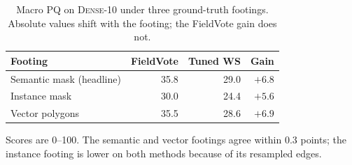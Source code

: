 \documentclass[conference]{IEEEtran}
\begin{document}
\begin{table}[t]
\centering
\caption{Macro PQ on \textsc{Dense-10} under three ground-truth footings. Absolute values shift with the footing; the FieldVote gain does not.}
\label{tab:footing}
\begin{tabular}{@{}lrrr@{}}
\toprule
Footing & FieldVote & Tuned WS & Gain \\
\midrule
Semantic mask (headline) & 35.8 & 29.0 & $+6.8$ \\
Instance mask & 30.0 & 24.4 & $+5.6$ \\
Vector polygons & 35.5 & 28.6 & $+6.9$ \\
\bottomrule
\end{tabular}

\smallskip
\begin{minipage}{0.94\columnwidth}
\footnotesize Scores are 0--100. The semantic and vector footings agree within 0.3 points; the instance footing is lower on both methods because of its resampled edges.
\end{minipage}
\end{table}



\end{document}
